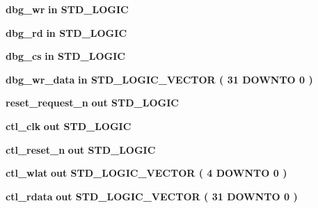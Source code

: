 \begin{DoxyCompactItemize}
\item 
{\bf dbg\+\_\+wr}  {\bfseries {\bfseries \textcolor{keywordflow}{in}\textcolor{vhdlchar}{ }}} {\bfseries \textcolor{comment}{S\+T\+D\+\_\+\+L\+O\+G\+IC}\textcolor{vhdlchar}{ }} 
\item 
{\bf dbg\+\_\+rd}  {\bfseries {\bfseries \textcolor{keywordflow}{in}\textcolor{vhdlchar}{ }}} {\bfseries \textcolor{comment}{S\+T\+D\+\_\+\+L\+O\+G\+IC}\textcolor{vhdlchar}{ }} 
\item 
{\bf dbg\+\_\+cs}  {\bfseries {\bfseries \textcolor{keywordflow}{in}\textcolor{vhdlchar}{ }}} {\bfseries \textcolor{comment}{S\+T\+D\+\_\+\+L\+O\+G\+IC}\textcolor{vhdlchar}{ }} 
\item 
{\bf dbg\+\_\+wr\+\_\+data}  {\bfseries {\bfseries \textcolor{keywordflow}{in}\textcolor{vhdlchar}{ }}} {\bfseries \textcolor{comment}{S\+T\+D\+\_\+\+L\+O\+G\+I\+C\+\_\+\+V\+E\+C\+T\+OR}\textcolor{vhdlchar}{ }\textcolor{vhdlchar}{(}\textcolor{vhdlchar}{ }\textcolor{vhdlchar}{ } \textcolor{vhdldigit}{31} \textcolor{vhdlchar}{ }\textcolor{keywordflow}{D\+O\+W\+N\+TO}\textcolor{vhdlchar}{ }\textcolor{vhdlchar}{ } \textcolor{vhdldigit}{0} \textcolor{vhdlchar}{ }\textcolor{vhdlchar}{)}\textcolor{vhdlchar}{ }} 
\item 
{\bf reset\+\_\+request\+\_\+n}  {\bfseries {\bfseries \textcolor{keywordflow}{out}\textcolor{vhdlchar}{ }}} {\bfseries \textcolor{comment}{S\+T\+D\+\_\+\+L\+O\+G\+IC}\textcolor{vhdlchar}{ }} 
\item 
{\bf ctl\+\_\+clk}  {\bfseries {\bfseries \textcolor{keywordflow}{out}\textcolor{vhdlchar}{ }}} {\bfseries \textcolor{comment}{S\+T\+D\+\_\+\+L\+O\+G\+IC}\textcolor{vhdlchar}{ }} 
\item 
{\bf ctl\+\_\+reset\+\_\+n}  {\bfseries {\bfseries \textcolor{keywordflow}{out}\textcolor{vhdlchar}{ }}} {\bfseries \textcolor{comment}{S\+T\+D\+\_\+\+L\+O\+G\+IC}\textcolor{vhdlchar}{ }} 
\item 
{\bf ctl\+\_\+wlat}  {\bfseries {\bfseries \textcolor{keywordflow}{out}\textcolor{vhdlchar}{ }}} {\bfseries \textcolor{comment}{S\+T\+D\+\_\+\+L\+O\+G\+I\+C\+\_\+\+V\+E\+C\+T\+OR}\textcolor{vhdlchar}{ }\textcolor{vhdlchar}{(}\textcolor{vhdlchar}{ }\textcolor{vhdlchar}{ } \textcolor{vhdldigit}{4} \textcolor{vhdlchar}{ }\textcolor{keywordflow}{D\+O\+W\+N\+TO}\textcolor{vhdlchar}{ }\textcolor{vhdlchar}{ } \textcolor{vhdldigit}{0} \textcolor{vhdlchar}{ }\textcolor{vhdlchar}{)}\textcolor{vhdlchar}{ }} 
\item 
{\bf ctl\+\_\+rdata}  {\bfseries {\bfseries \textcolor{keywordflow}{out}\textcolor{vhdlchar}{ }}} {\bfseries \textcolor{comment}{S\+T\+D\+\_\+\+L\+O\+G\+I\+C\+\_\+\+V\+E\+C\+T\+OR}\textcolor{vhdlchar}{ }\textcolor{vhdlchar}{(}\textcolor{vhdlchar}{ }\textcolor{vhdlchar}{ } \textcolor{vhdldigit}{31} \textcolor{vhdlchar}{ }\textcolor{keywordflow}{D\+O\+W\+N\+TO}\textcolor{vhdlchar}{ }\textcolor{vhdlchar}{ } \textcolor{vhdldigit}{0} \textcolor{vhdlchar}{ }\textcolor{vhdlchar}{)}\textcolor{vhdlchar}{ }} 

\end{DoxyCompactItemize}
